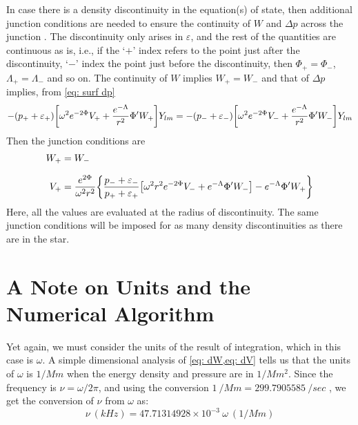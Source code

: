\documentclass[a4paper,12pt,onehalfspacing]{report}
\begin{document}
In case there is a density discontinuity in the equation(s) of state, then additional junction conditions are needed to ensure the continuity of $W$ and $\Delta p$ across the junction \cite{Sotani}. The discontinuity only arises in $\varepsilon$, and the rest of the quantities are continuous as is, i.e., if the `$+$' index refers to the point just after the discontinuity, `$-$' index the point just before the discontinuity, then $\Phi_+= \Phi_-$, $\Lambda_+= \Lambda_-$ and so on. The continuity of $W$ implies $W_+= W_-$ and that of $\Delta p$ implies, from \cref{eq: surf dp}
\begin{align*}
    -\qty(p_+ +\varepsilon_+)\qty[\omega^2 e^{-2\Phi} V_++\frac{e^{-\Lambda}}{r^2}\Phi'W_+]Y_{lm}= -\qty(p_- +\varepsilon_-)\qty[\omega^2 e^{-2\Phi} V_-+\frac{e^{-\Lambda}}{r^2}\Phi'W_-]Y_{lm}
\end{align*}
Then the junction conditions are
\begin{align}
    W_+&= W_-\label{eq: junc W}\\[1.5ex]
    V_+&= \frac{e^{2\Phi}}{\omega^2 r^2}\qty{\frac{p_- +\varepsilon_-}{p_+ +\varepsilon_+}\qty[\omega^2r^2 e^{-2\Phi} V_-+{e^{-\Lambda}}\Phi'W_-]- {e^{-\Lambda}}\Phi'W_+}\label{eq: junc V}
\end{align}
Here, all the values are evaluated at the radius of discontinuity. The same junction conditions will be imposed for as many density discontinuities as there are in the star. 

\section{A Note on Units and the Numerical Algorithm}
Yet again, we must consider the units of the result of integration, which in this case is $\omega$. A simple dimensional analysis of \cref{eq: dW,eq: dV} tells us that the units of $\omega$ is $1/Mm$ when the energy density and pressure are in $1/Mm^2$. Since the frequency is $\nu= \omega/2\pi$, and using the conversion $1\ /Mm= 299.7905585\ /sec$ \cite{Glendenning}, we get the conversion of $\nu$ from $\omega$ as:
$$\nu\  (kHz)= 47.71314928\times 10^{-3}\ \omega\ (1/Mm)$$
\end{document}
